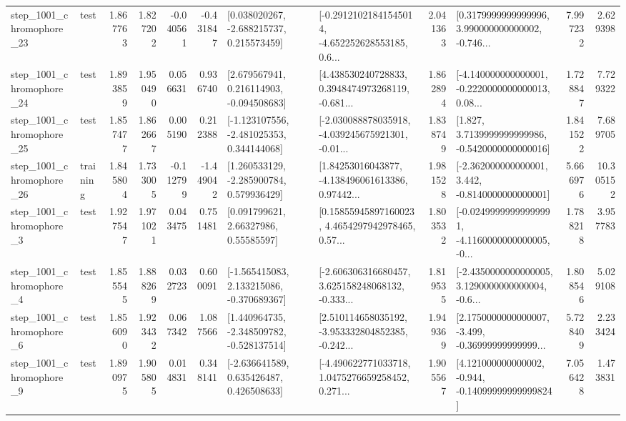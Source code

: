 \begin{tabular}{llrrrrllrlrr}
 step\_1001\_chromophore\_23 &      test &      1.867763 &    1.827202 &     -0.040561 & -0.431847 &    [0.038020267, -2.688215737, 0.215573459] &  [-0.29121021841545014, -4.652252628553185, 0.6... &       2.041363 &  [0.3179999999999996, 3.990000000000002, -0.746... &            7.997232 &          2.629398 \\
 step\_1001\_chromophore\_24 &      test &      1.893859 &    1.950490 &      0.056631 &  0.936740 &    [2.679567941, 0.216114903, -0.094508683] &  [4.438530240728833, 0.3948474973268119, -0.681... &       1.862894 &  [-4.140000000000001, -0.2220000000000013, 0.08... &            1.728847 &          7.729322 \\
 step\_1001\_chromophore\_25 &      test &      1.857477 &    1.862667 &      0.005190 &  0.212388 &   [-1.123107556, -2.481025353, 0.344144068] &  [-2.030088878035918, -4.039245675921301, -0.01... &       1.838749 &   [1.827, 3.7139999999999986, -0.5420000000000016] &            1.841522 &          7.689705 \\
 step\_1001\_chromophore\_26 &  training &      1.845804 &    1.733005 &     -0.112799 & -1.449042 &    [1.260533129, -2.285900784, 0.579936429] &  [1.84253016043877, -4.138496061613386, 0.97442... &       1.981528 &   [-2.362000000000001, 3.442, -0.8140000000000001] &            5.666976 &         10.305152 \\
  step\_1001\_chromophore\_3 &      test &      1.927547 &    1.971021 &      0.043475 &  0.751481 &       [0.091799621, 2.66327986, 0.55585597] &  [0.15855945897160023, 4.4654297942978465, 0.57... &       1.803532 &  [-0.02499999999999991, -4.1160000000000005, -0... &            1.788218 &          3.957783 \\
  step\_1001\_chromophore\_4 &      test &      1.855545 &    1.888269 &      0.032723 &  0.600091 &   [-1.565415083, 2.133215086, -0.370689367] &  [-2.606306316680457, 3.625158248068132, -0.333... &       1.819535 &  [-2.4350000000000005, 3.1290000000000004, -0.6... &            1.808546 &          5.029108 \\
  step\_1001\_chromophore\_6 &      test &      1.856090 &    1.923432 &      0.067342 &  1.087566 &   [1.440964735, -2.348509782, -0.528137514] &  [2.510114658035192, -3.953332804852385, -0.242... &       1.949369 &  [2.1750000000000007, -3.499, -0.36999999999999... &            5.728409 &          2.233424 \\
  step\_1001\_chromophore\_9 &      test &      1.890975 &    1.905805 &      0.014831 &  0.348141 &    [-2.636641589, 0.635426487, 0.426508633] &  [-4.490622771033718, 1.0475276659258452, 0.271... &       1.905567 &  [4.121000000000002, -0.944, -0.14099999999999824] &            7.056428 &          1.473831 \\

\end{tabular}
